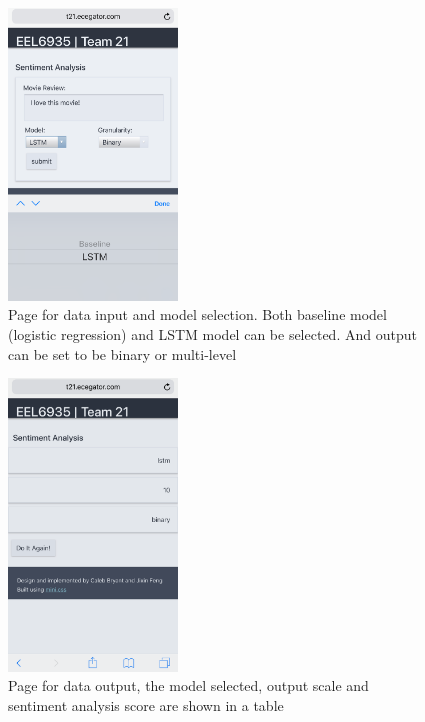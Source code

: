 \documentclass[conference]{IEEEtran}
\begin{document}
    \begin{figure}
        \center\includegraphics[width=0.4\textwidth]{figure/flask_input}
        \caption{Page for data input and model selection. Both baseline model (logistic
        regression) and LSTM model can be selected. And output can be set to be binary 
        or multi-level}
        \label{fig:flask_in}
    \end{figure}
    
    \begin{figure}
        \center\includegraphics[width=0.4\textwidth]{figure/flask_output}
        \caption{Page for data output, the model selected, output scale and
        sentiment analysis score are shown in a table}
        \label{fig:flask_out}
    \end{figure}
    
\end{document}
